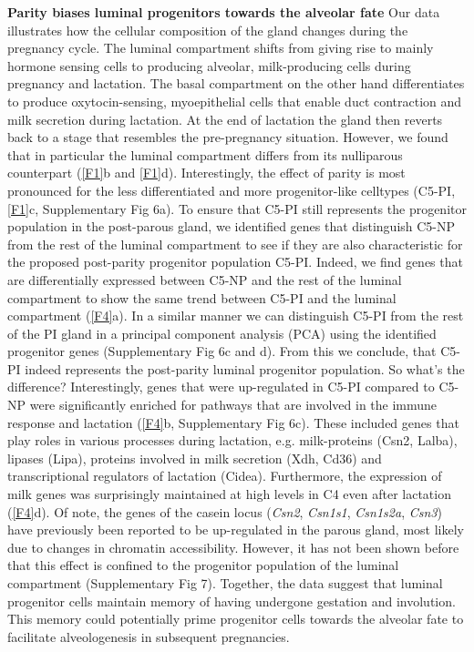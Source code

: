 \documentclass[titlepage, 12pt, oneside]{amsart}
\begin{document}
\textbf{Parity biases luminal progenitors towards the alveolar fate}
Our data illustrates how the cellular composition of the gland changes during the pregnancy cycle.
The luminal compartment shifts from giving rise to mainly hormone sensing cells to producing alveolar, milk-producing cells during pregnancy and lactation. 
The basal compartment on the other hand differentiates to produce oxytocin-sensing, myoepithelial cells that enable duct contraction and milk secretion during lactation.
At the end of lactation the gland then reverts back to a stage that resembles the pre-pregnancy situation.
However, we found that in particular the luminal compartment differs from its nulliparous counterpart (\autoref{F1}b and \autoref{F1}d).
Interestingly, the effect of parity is most pronounced for the less differentiated and more progenitor-like celltypes (C5-PI, \autoref{F1}c, Supplementary Fig 6a).
To ensure that C5-PI still represents the progenitor population in the post-parous gland, we identified genes that distinguish C5-NP from the rest of the luminal compartment to see if they are also characteristic for the proposed post-parity progenitor population C5-PI.
Indeed, we find genes that are differentially expressed between C5-NP and the rest of the luminal compartment to show the same trend between C5-PI and the luminal compartment (\autoref{F4}a).
In a similar manner we can distinguish C5-PI from the rest of the PI gland in a principal component analysis (PCA) using the identified progenitor genes (Supplementary Fig 6c and d).
From this we conclude, that C5-PI indeed represents the post-parity luminal progenitor population.
So what's the difference?
Interestingly, genes that were up-regulated in C5-PI compared to C5-NP were significantly enriched for pathways that are involved in the immune response and lactation (\autoref{F4}b, Supplementary Fig 6c).
These included genes that play roles in various processes during lactation, e.g. milk-proteins (Csn2, Lalba), lipases (Lipa), proteins involved in milk secretion (Xdh, Cd36) and transcriptional regulators of lactation (Cidea).
Furthermore, the expression of milk genes was surprisingly maintained at high levels in C4 even after lactation (\autoref{F4}d).
Of note, the genes of the casein locus (\textit{Csn2}, \textit{Csn1s1}, \textit{Csn1s2a}, \textit{Csn3}) have previously been reported to be up-regulated in the parous gland, most likely due to changes in chromatin accessibility\autocite{Dos2015,Rijnkels2013}.
However, it has not been shown before that this effect is confined to the progenitor population of the luminal compartment (Supplementary Fig 7).
Together, the data suggest that luminal progenitor cells maintain memory of having undergone gestation and involution.
This memory could potentially prime progenitor cells towards the alveolar fate to facilitate alveologenesis in subsequent pregnancies.
\end{document}
